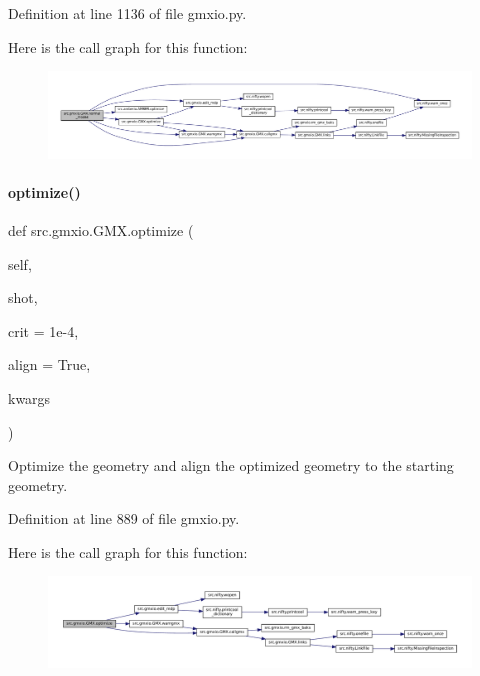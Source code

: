 Definition at line 1136 of file gmxio.\+py.

Here is the call graph for this function\+:
\nopagebreak
\begin{figure}[H]
\begin{center}
\leavevmode
\includegraphics[width=350pt]{classsrc_1_1gmxio_1_1GMX_adbb731b653e4f79880ee97a67d128805_cgraph}
\end{center}
\end{figure}
\mbox{\label{classsrc_1_1gmxio_1_1GMX_a92d0a874a4b720617b984cfb3f3117cf}} 
\paragraph{\texorpdfstring{optimize()}{optimize()}}
{\footnotesize\ttfamily def src.\+gmxio.\+G\+M\+X.\+optimize (\begin{DoxyParamCaption}\item[{}]{self,  }\item[{}]{shot,  }\item[{}]{crit = {\ttfamily 1e-\/4},  }\item[{}]{align = {\ttfamily True},  }\item[{}]{kwargs }\end{DoxyParamCaption})}



Optimize the geometry and align the optimized geometry to the starting geometry. 



Definition at line 889 of file gmxio.\+py.

Here is the call graph for this function\+:
\nopagebreak
\begin{figure}[H]
\begin{center}
\leavevmode
\includegraphics[width=350pt]{classsrc_1_1gmxio_1_1GMX_a92d0a874a4b720617b984cfb3f3117cf_cgraph}
\end{center}
\end{figure}
\mbox{\label{classsrc_1_1gmxio_1_1GMX_ab8b789bb8fb56f2cab0ba4dff7c5deb0}} 
